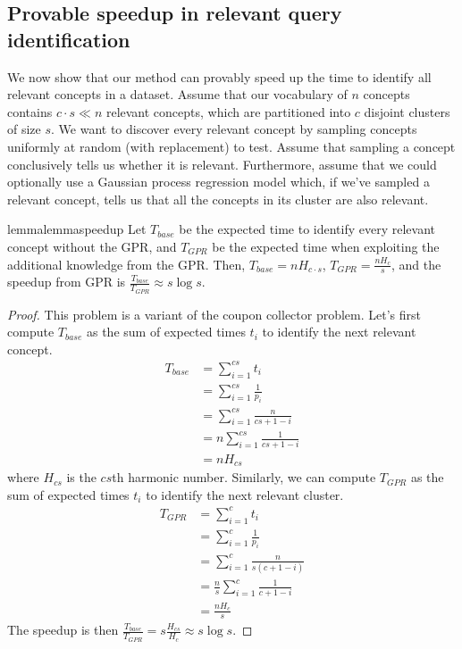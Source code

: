 \subsection{Provable speedup in relevant query identification}
\label{subsec:provable_speedup}
We now show that our method can provably speed up the time to identify all relevant concepts in a dataset.
Assume that our vocabulary of $n$ concepts contains $c \cdot s \ll n $ relevant concepts, which are partitioned into $c$ disjoint clusters of size $s$. We want to discover every relevant concept by sampling concepts uniformly at random (with replacement) to test. Assume that sampling a concept conclusively tells us whether it is relevant. Furthermore, assume that we could optionally use a Gaussian process regression model which, if we've sampled a relevant concept, tells us that all the concepts in its cluster are also relevant.\\

\begin{restatable}{lemma}{lemmaspeedup}
    \label{lemma:speedup}
    Let $T_{base}$ be the expected time to identify every relevant concept without the GPR, and $T_{GPR}$ be the expected time when exploiting the additional knowledge from the GPR. Then, $T_{base} = n H_{c \cdot s}$, $T_{GPR} = \frac{nH_{c}}{s}$, and the speedup from GPR is $\frac{T_{base}}{T_{GPR}} \approx s \log s$.
\end{restatable}

\begin{proof}
    This problem is a variant of the coupon collector problem. Let's first compute $T_{base}$ as the sum of expected times $t_i$ to identify the next relevant concept. 
    \begin{align}
        T_{base} &= \sum_{i=1}^{cs} t_i \\
                 &= \sum_{i=1}^{cs} \frac{1}{p_i} \\
                 &= \sum_{i=1}^{cs} \frac{n}{cs + 1 - i} \\
                 &= n \sum_{i=1}^{cs} \frac{1}{cs + 1 - i} \\
                 &= n H_{cs}
    \end{align}
    where $H_{cs}$ is the $cs$th harmonic number. Similarly, we can compute $T_{GPR}$ as the sum of expected times $t_i$ to identify the next relevant cluster.  
    \begin{align}
        T_{GPR} &= \sum_{i=1}^{c} t_i \\
                 &= \sum_{i=1}^{c} \frac{1}{p_i} \\
                 &= \sum_{i=1}^{c} \frac{n}{s (c + 1 - i)} \\
                 &= \frac{n}{s} \sum_{i=1}^{c} \frac{1}{c + 1 - i} \\
                 &= \frac{nH_{c}}{s}
    \end{align}
    The speedup is then $\displaystyle \frac{T_{base}}{T_{GPR}} = s \frac{H_{cs}}{H_c} \approx s \log s$.
\end{proof}

